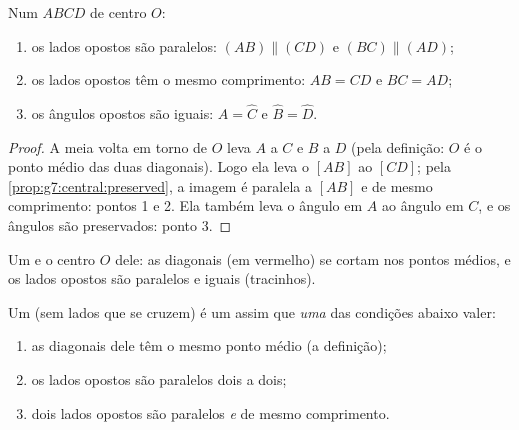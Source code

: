 \begin{theorem}\label{thm:g7:central:properties}
Num  $ABCD$ de centro $O$:
\begin{enumerate}
  \item os lados opostos são paralelos: $(AB) \parallel (CD)$ e
        $(BC) \parallel (AD)$;
  \item os lados opostos têm o mesmo comprimento: $AB = CD$ e
        $BC = AD$;
  \item os ângulos opostos são iguais: $\widehat A = \widehat C$ e
        $\widehat B = \widehat D$.
\end{enumerate}
\end{theorem}

\begin{proof}
A meia volta em torno de $O$ leva $A$ a $C$ e $B$ a $D$ (pela
definição: $O$ é o ponto médio das duas diagonais). Logo ela leva o
 $[AB]$ ao  $[CD]$; pela
\cref{prop:g7:central:preserved}, a imagem é paralela a $[AB]$ e de
mesmo comprimento: pontos 1 e 2. Ela também leva o ângulo em $A$ ao
ângulo em $C$, e os ângulos são preservados: ponto 3.
\end{proof}

\begin{omfigure}

{\small Um  e o centro $O$ dele: as diagonais (em
vermelho) se cortam nos pontos médios, e os lados opostos são paralelos
e iguais (tracinhos).}
\end{omfigure}

\begin{theorem}\label{thm:g7:central:recognize}
Um  (sem lados que se cruzem) é um  assim que
\emph{uma} das condições abaixo valer:
\begin{enumerate}
  \item as diagonais dele têm o mesmo ponto médio (a definição);
  \item os lados opostos são paralelos dois a dois;
  \item dois lados opostos são paralelos \emph{e} de mesmo
        comprimento.
\end{enumerate}
\end{theorem}
\admitted

